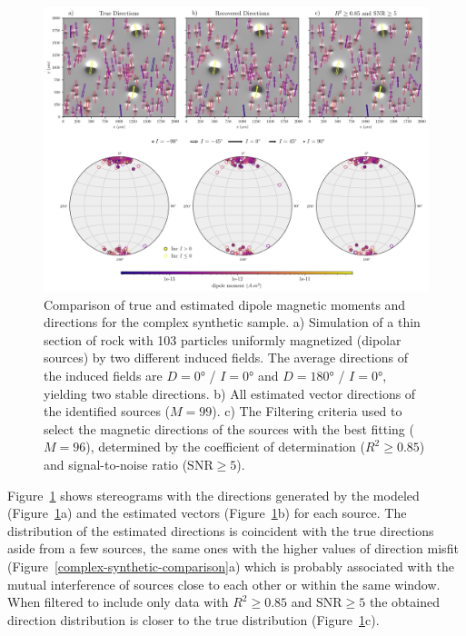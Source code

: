 \begin{figure}[tb!]
\centering
\includegraphics[width=1\linewidth]{figures/complex-synthetic-stereograms.png}
\caption{ Comparison of true and estimated dipole magnetic moments and directions for the complex synthetic sample.
a) Simulation of a thin section of rock with 103 particles uniformly magnetized (dipolar sources) by two different induced fields. The average directions of the induced fields are $D=\ang{0}$ / $I=\ang{0}$ and $D=\ang{180}$ / $I=\ang{0}$, yielding two stable directions. b) All estimated vector directions of the identified sources ($M=99$). c) The Filtering criteria used to select the magnetic directions of the sources with the best fitting ($M=96$), determined by the coefficient of determination ($R^2 \geq 0.85$) and signal-to-noise ratio ($\text{SNR} \geq 5$).
}
\label{complex-synthetic-stereograms}
\end{figure}

Figure~\ref{complex-synthetic-stereograms} shows stereograms with the directions generated by the modeled (Figure~\ref{complex-synthetic-stereograms}a) and the estimated vectors (Figure~\ref{complex-synthetic-stereograms}b) for each source. The distribution of the estimated directions is coincident with the true directions aside from a few sources, the same ones with the higher values of direction misfit (Figure~\ref{complex-synthetic-comparison}a) which is probably associated with the mutual interference of sources close to each other or within the same window. When filtered to include only data with $R^2 \geq 0.85$ and $\text{SNR} \geq 5$ the obtained direction distribution is closer to the true distribution (Figure~\ref{complex-synthetic-stereograms}c).

